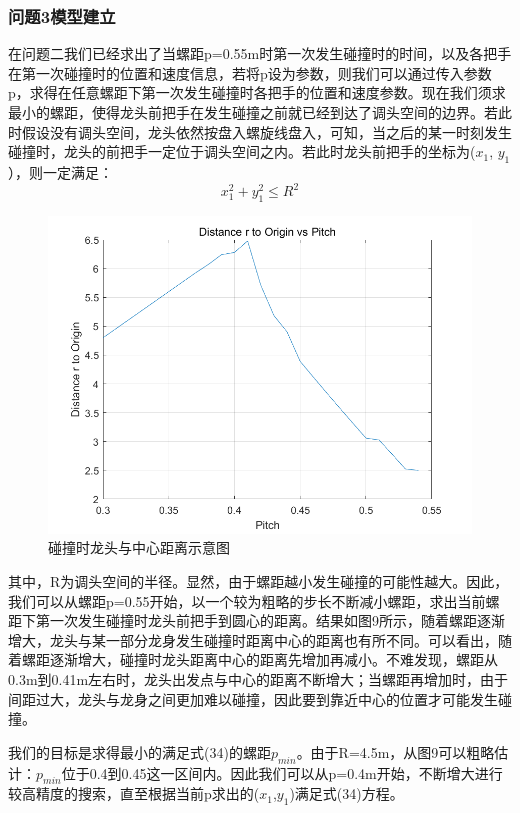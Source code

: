 \documentclass{cumcmthesis1}
\begin{document}
\subsubsection{\textbf{问题3}模型建立}
在问题二我们已经求出了当螺距p=0.55m时第一次发生碰撞时的时间，以及各把手在第一次碰撞时的位置和速度信息，若将p设为参数，则我们可以通过传入参数p，求得在任意螺距下第一次发生碰撞时各把手的位置和速度参数。现在我们须求最小的螺距，使得龙头前把手在发生碰撞之前就已经到达了调头空间的边界。若此时假设没有调头空间，龙头依然按盘入螺旋线盘入，可知，当之后的某一时刻发生碰撞时，龙头的前把手一定位于调头空间之内。若此时龙头前把手的坐标为($x_1$, $y_1$），则一定满足：
\begin{equation}
    x_1^2 + y_1^2 \leq R^2
\end{equation}
\begin{figure}
    \caption{碰撞时龙头与中心距离示意图}
    \centering    
    \includegraphics[width=0.7\linewidth]{5.3.4.png}
\end{figure}
其中，R为调头空间的半径。显然，由于螺距越小发生碰撞的可能性越大。因此，我们可以从螺距p=0.55开始，以一个较为粗略的步长不断减小螺距，求出当前螺距下第一次发生碰撞时龙头前把手到圆心的距离。结果如图9所示，随着螺距逐渐增大，龙头与某一部分龙身发生碰撞时距离中心的距离也有所不同。可以看出，随着螺距逐渐增大，碰撞时龙头距离中心的距离先增加再减小。不难发现，螺距从0.3m到0.41m左右时，龙头出发点与中心的距离不断增大；当螺距再增加时，由于间距过大，龙头与龙身之间更加难以碰撞，因此要到靠近中心的位置才可能发生碰撞。
\par
我们的目标是求得最小的满足式(34)的螺距$p_{min}$。由于R=4.5m，从图9可以粗略估计：$p_{min}$位于0.4到0.45这一区间内。因此我们可以从p=0.4m开始，不断增大进行较高精度的搜索，直至根据当前p求出的($x_1$,$y_1$)满足式(34)方程。
\par
\end{document}
